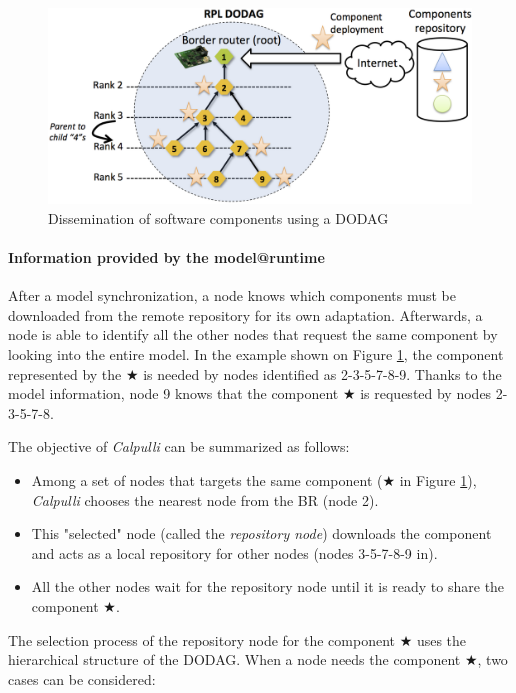\begin{figure}[htb]
	\centering
	\includegraphics[width=0.98\columnwidth]{chapters/calpulli.images/MAR_dodag.png}
	\caption{Dissemination of software components using a DODAG} \label{fig:MARdodag}
\end{figure}

\paragraph{Information provided by the model@runtime} After a model synchronization, a node knows which components must be downloaded from the remote repository for its own adaptation.
Afterwards, a node is able to identify all the other nodes that request the same component by looking into the entire model.
In the example shown on Figure \ref{fig:MARdodag}, the component represented by the $\bigstar$ is needed by nodes identified as 2-3-5-7-8-9. 
Thanks to the model information, node 9 knows that the component $\bigstar$ is requested by nodes 2-3-5-7-8.

The objective of \emph{Calpulli} can be summarized as follows:
\begin{itemize}
	\item Among a set of nodes that targets the same component ($\bigstar$ in Figure \ref{fig:MARdodag}), \emph{Calpulli} chooses the nearest node from the BR (node 2).
	\item This "selected" node (called the \emph{repository node}) downloads the component and acts as a local repository for other nodes (nodes 3-5-7-8-9 in).
	\item All the other nodes wait for the repository node until it is ready to share the component $\bigstar$.
\end{itemize}

The selection process of the repository node for the component $\bigstar$ uses the hierarchical structure of the DODAG. When a node needs the component $\bigstar$, two cases can be considered:

